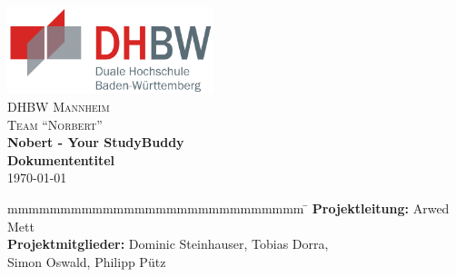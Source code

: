 
\begin{titlepage}
	\begin{center}
        \includegraphics[width=0.45\textwidth]{images/dhbw.png}~\\[3cm]
        \textsc{\LARGE DHBW Mannheim}\\[1.5em]
        \textsc{\LARGE Team \enquote{Norbert}}\\[1.5em]
        { \huge \bfseries Nobert - Your StudyBuddy \\[0.5cm] }
        { \LARGE \bfseries Dokumententitel \\[0.4cm] }
        \today
	\end{center}
	\vfill
	\begin{spacing}{1.2}
	\begin{tabbing}
		mmmmmmmmmmmmmmmmmmmmmmmmmmmm \= \kill
        \textbf{Projektleitung:}        \> Arwed Mett\\
        \textbf{Projektmitglieder:}       \> Dominic Steinhauser, Tobias Dorra,\\
     								   \> Simon Oswald, Philipp Pütz\\
	\end{tabbing}
	\end{spacing}
\end{titlepage}
